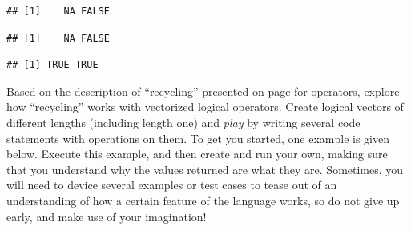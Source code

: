 \documentclass[krantz2]{krantz}\usepackage{knitr}%
\begin{document}
\begin{knitrout}\footnotesize
{}\color{fgcolor}\begin{kframe}
\begin{alltt}
 \hlopt{&}  \hlopt{&} 
\end{alltt}
\begin{verbatim}
## [1]    NA FALSE
\end{verbatim}
\begin{alltt}
 \hlopt{&}  \hlopt{&} \hlstd{(}\hlstd{,} \hlstd{)}
\end{alltt}
\begin{verbatim}
## [1]    NA FALSE
\end{verbatim}
\begin{alltt}
 \hlopt{|}  \hlopt{|} \hlstd{(}\hlstd{,} \hlstd{)}
\end{alltt}
\begin{verbatim}
## [1] TRUE TRUE
\end{verbatim}
\end{kframe}
\end{knitrout}

\begin{playground}
Based on the description of ``recycling'' presented on page \pageref{par:recycling:numeric} for  operators, explore how ``recycling'' works with vectorized logical operators. Create logical vectors of different lengths (including length one) and \emph{play} by writing several code statements with operations on them. To get you started, one example is given below. Execute this example, and then create and run your own, making sure that you understand why the values returned are what they are. Sometimes, you will need to device several examples or test cases to tease out of \Rlang an understanding of how a certain feature of the language works, so do not give up early, and make use of your imagination!

\begin{knitrout}\footnotesize
{}\color{fgcolor}\begin{kframe}
\begin{alltt}
 \hlkwb{<-} \hlstd{(}\hlstd{,} \hlstd{,} \hlstd{,} \hlstd{)}
 \hlopt{&} 
 \hlopt{|} \hlstd{(}\hlstd{,} \hlstd{)}
\end{alltt}
\end{kframe}
\end{knitrout}

\end{playground}
\end{document}

